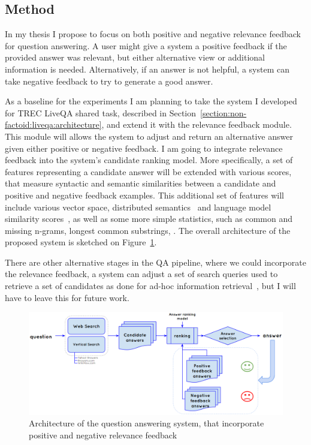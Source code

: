 \subsection{Method}
\label{section:users:proposal:method}

In my thesis I propose to focus on both positive and negative relevance feedback for question answering.
A user might give a system a positive feedback if the provided answer was relevant, but either alternative view or additional information is needed.
Alternatively, if an answer is not helpful, a system can take negative feedback to try to generate a good answer.

As a baseline for the experiments I am planning to take the system I developed for TREC LiveQA shared task, described in Section~\ref{section:non-factoid:liveqa:architecture}, and extend it with the relevance feedback module.
This module will allows the system to adjust and return an alternative answer given either positive or negative feedback.
I am going to integrate relevance feedback into the system's candidate ranking model.
More specifically, a set of features representing a candidate answer will be extended with various scores, that measure syntactic and semantic similarities between a candidate and positive and negative feedback examples.
This additional set of features will include various vector space, distributed semantics~\cite{kusner2015word} and language model similarity scores~\cite{wang2008study}, as well as some more simple statistics, such as common and missing n-grams, longest common substrings, \etc.
The overall architecture of the proposed system is sketched on Figure~\ref{figure:users:proposal:model}.

There are other alternative stages in the QA pipeline, where we could incorporate the relevance feedback, \eg a system can adjust a set of search queries used to retrieve a set of candidates as done for ad-hoc information retrieval~\cite{rocchio1971relevance}, but I will have to leave this for future work.

\begin{figure}
\centering
\includegraphics[width=\textwidth]{img/userfeedback_model}
\caption{Architecture of the question answering system, that incorporate positive and negative relevance feedback}
\label{figure:users:proposal:model}
\end{figure}

